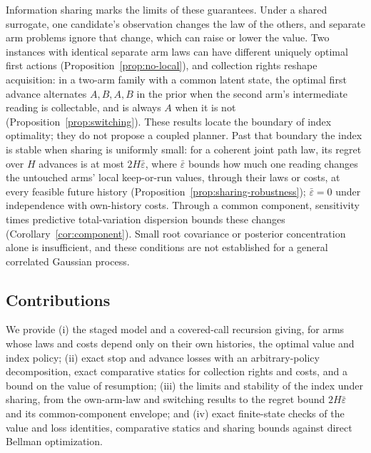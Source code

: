 Information sharing marks the limits of these guarantees. Under a shared surrogate, one
candidate's observation changes the law of the others, and separate arm problems ignore that
change, which can raise or lower the value. Two instances with identical separate
arm laws can have different uniquely optimal first actions (Proposition~\ref{prop:no-local}),
and collection rights reshape acquisition: in a two-arm family with a common
latent state, the optimal first advance alternates $A,B,A,B$ in the prior when the second
arm's intermediate reading is collectable, and is always $A$ when it is not
(Proposition~\ref{prop:switching}). These results locate the boundary of index optimality;
they do not propose a coupled planner. Past that boundary the index is
stable when sharing is uniformly small: for a coherent joint path law, its regret over $H$
advances is at most $2H\bar\varepsilon$, where $\bar\varepsilon$ bounds how much one reading
changes the untouched arms' local keep-or-run values, through their laws or costs, at every
feasible future history (Proposition~\ref{prop:sharing-robustness}); $\bar\varepsilon=0$ under
independence with own-history costs.
Through a common component, sensitivity times predictive total-variation dispersion bounds
these changes (Corollary~\ref{cor:component}). Small root covariance or posterior
concentration alone is insufficient, and these conditions are not established for a general
correlated Gaussian process.

\subsection{Contributions}
\label{sec:contributions}
We provide (i) the staged model and a covered-call recursion giving, for arms whose laws and
costs depend only on their own histories, the optimal value and index policy; (ii) exact stop
and advance losses with an arbitrary-policy decomposition, exact comparative statics for
collection rights and costs, and a bound on the value of resumption; (iii) the limits and
stability of the index under sharing, from the own-arm-law and switching results to the regret
bound $2H\bar\varepsilon$ and its common-component envelope; and (iv) exact finite-state checks of
the value and loss identities, comparative statics and sharing bounds against direct Bellman optimization.

